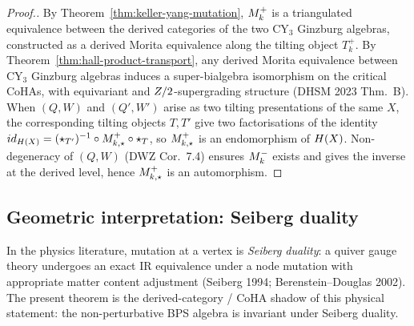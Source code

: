 \begin{proof}[Proof.]
By Theorem~\ref{thm:keller-yang-mutation}, $M_k^{+}$ is a triangulated
equivalence between the derived categories of the two CY$_3$ Ginzburg
algebras, constructed as a derived Morita equivalence along the tilting
object $T_k^{+}$. By Theorem~\ref{thm:hall-product-transport}, any derived
Morita equivalence between CY$_3$ Ginzburg algebras induces a super-bialgebra
isomorphism on the critical CoHAs, with equivariant and $Z/2$-supergrading
structure (DHSM 2023 Thm.~B). When $(Q, W)$ and $(Q', W')$ arise as two
tilting presentations of the same $X$, the corresponding tilting objects
$T, T'$ give two factorisations of the identity
$id_{H(X)} = (\star_{T'})^{-1} \circ M_{k,\star}^{+} \circ \star_T$,
so $M_{k,\star}^{+}$ is an endomorphism of $H(X)$. Non-degeneracy of
$(Q, W)$ (DWZ Cor.~7.4) ensures $M_k^{-}$ exists and gives the inverse
at the derived level, hence $M_{k,\star}^{+}$ is an automorphism.
\end{proof}

\subsection*{Geometric interpretation: Seiberg duality}

In the physics literature, mutation at a vertex is \emph{Seiberg duality}: a
quiver gauge theory undergoes an exact IR equivalence under a node mutation
with appropriate matter content adjustment (Seiberg 1994; Berenstein--Douglas
2002). The present theorem is the derived-category / CoHA shadow of this
physical statement: the non-perturbative BPS algebra is invariant under
Seiberg duality.

